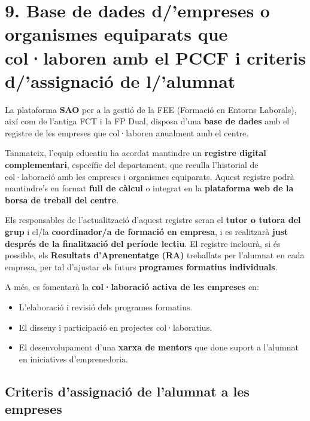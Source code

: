 \documentclass[
  paper=a4,
  ,captions=tableheading
]{scrartcl}
\providecommand{\tightlist}{%
  \setlength{\itemsep}{0pt}\setlength{\parskip}{0pt}}
\begin{document}
\hypertarget{base-de-dades-dempreses-o-organismes-equiparats-que-collaboren-amb-el-pccf-i-criteris-dassignaciuxf3-de-lalumnat}{%
\section{9. Base de dades d/'empreses o organismes equiparats que
col·laboren amb el PCCF i criteris d/'assignació de
l/'alumnat}\label{base-de-dades-dempreses-o-organismes-equiparats-que-collaboren-amb-el-pccf-i-criteris-dassignaciuxf3-de-lalumnat}}

La plataforma \textbf{SAO} per a la gestió de la FEE (Formació en
Entorns Laborals), així com de l'antiga FCT i la FP Dual, disposa d'una
\textbf{base de dades} amb el registre de les empreses que col·laboren
anualment amb el centre.

Tanmateix, l'equip educatiu ha acordat mantindre un \textbf{registre
digital complementari}, específic del departament, que reculla
l'historial de col·laboració amb les empreses i organismes equiparats.
Aquest registre podrà mantindre's en format \textbf{full de càlcul} o
integrat en la \textbf{plataforma web de la borsa de treball del
centre}.

Els responsables de l'actualització d'aquest registre seran el
\textbf{tutor o tutora del grup} i el/la \textbf{coordinador/a de
formació en empresa}, i es realitzarà \textbf{just després de la
finalització del període lectiu}. El registre inclourà, si és possible,
els \textbf{Resultats d'Aprenentatge (RA)} treballats per l'alumnat en
cada empresa, per tal d'ajustar els futurs \textbf{programes formatius
individuals}.

A més, es fomentarà la \textbf{col·laboració activa de les empreses} en:

\begin{itemize}
\tightlist
\item
  L'elaboració i revisió dels programes formatius.
\item
  El disseny i participació en projectes col·laboratius.
\item
  El desenvolupament d'una \textbf{xarxa de mentors} que done suport a
  l'alumnat en iniciatives d'emprenedoria.
\end{itemize}

\hypertarget{criteris-dassignaciuxf3-de-lalumnat-a-les-empreses}{%
\subsection{Criteris d'assignació de l'alumnat a les
empreses}\label{criteris-dassignaciuxf3-de-lalumnat-a-les-empreses}}
\end{document}
